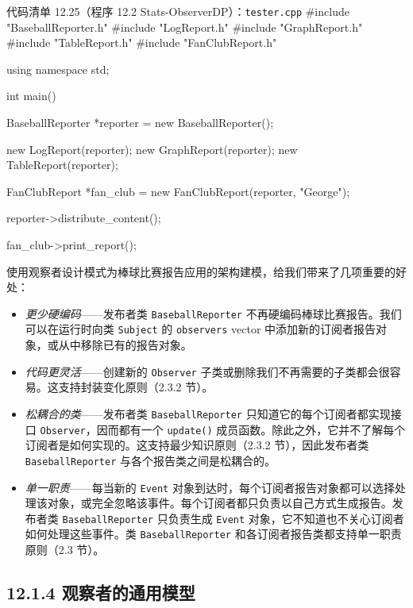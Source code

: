\begin{codeboxt}{代码清单 12.25（程序 12.2 Stats-ObserverDP）：\texttt{tester.\allowbreak{}cpp}}
#include "BaseballReporter.h"
#include "LogReport.h"
#include "GraphReport.h"
#include "TableReport.h"
#include "FanClubReport.h"

using namespace std;

int main()
{
    BaseballReporter *reporter = new BaseballReporter();

    new LogReport(reporter);
    new GraphReport(reporter);
    new TableReport(reporter);

    FanClubReport *fan_club = new FanClubReport(reporter, "George");

    reporter->distribute_content();

    fan_club->print_report();
}
\end{codeboxt}

使用观察者设计模式为棒球比赛报告应用的架构建模，给我们带来了几项重要的好处：

\begin{itemize}
\item \emph{更少硬编码}——发布者类 \texttt{Baseball\allowbreak{}Reporter} 不再硬编码棒球比赛报告。我们可以在运行时向类 \texttt{Subject} 的 \texttt{observers} vector 中添加新的订阅者报告对象，或从中移除已有的报告对象。
\item \emph{代码更灵活}——创建新的 \texttt{Observer} 子类或删除我们不再需要的子类都会很容易。这支持封装变化原则（2.3.2 节）。
\item \emph{松耦合的类}——发布者类 \texttt{Baseball\allowbreak{}Reporter} 只知道它的每个订阅者都实现接口 \texttt{Observer}，因而都有一个 \texttt{update()} 成员函数。除此之外，它并不了解每个订阅者是如何实现的。这支持最少知识原则（2.3.2 节），因此发布者类 \texttt{Baseball\allowbreak{}Reporter} 与各个报告类之间是松耦合的。
\item \emph{单一职责}——每当新的 \texttt{Event} 对象到达时，每个订阅者报告对象都可以选择处理该对象，或完全忽略该事件。每个订阅者都只负责以自己方式生成报告。发布者类 \texttt{Baseball\allowbreak{}Reporter} 只负责生成 \texttt{Event} 对象，它不知道也不关心订阅者如何处理这些事件。类 \texttt{Baseball\allowbreak{}Reporter} 和各订阅者报告类都支持单一职责原则（2.3 节）。
\end{itemize}


\subsection{12.1.4 观察者的通用模型}


